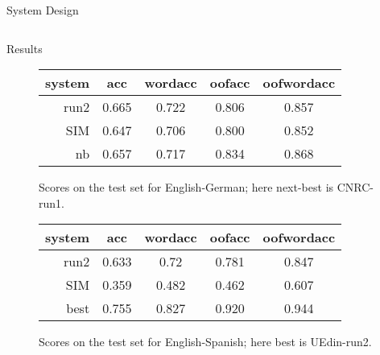 \documentclass[final,t]{beamer}
\begin{document}
\begin{frame}{}
\begin{columns}[t]
\begin{column}{.55\linewidth}
\begin{block}{System Design}
\begin{center}
\end{center}

\end{block}

    \end{column}
  \end{columns}

\begin{columns}
  \begin{column}{.64\linewidth}

\begin{block}{Results}

\begin{figure}[t]
  \begin{center}
  \begin{tabular}{|r|c|c|c|c|}
    \hline
    system & acc      & wordacc  & oofacc & oofwordacc \\
    \hline
    run2  &  0.665 & 0.722  &  0.806  & 0.857 \\
    SIM    &  0.647 & 0.706 & 0.800 & 0.852 \\
    nb     &  0.657   & 0.717   & 0.834 & 0.868    \\
    \hline
  \end{tabular}
  \end{center}
\caption{Scores on the test set for English-German; here next-best is CNRC-run1.}
\label{fig:theresults-en-de}
\end{figure}

\begin{figure}[t]
  \begin{center}
  \begin{tabular}{|r|c|c|c|c|}
    \hline
    system & acc      & wordacc  & oofacc & oofwordacc \\
    \hline
    run2  &  0.633 & 0.72 & 0.781 & 0.847 \\
    SIM    &  0.359 &  0.482 & 0.462 & 0.607 \\
    best   &  0.755 & 0.827   & 0.920  & 0.944 \\
    \hline
  \end{tabular}
  \end{center}
\caption{Scores on the test set for English-Spanish; here best is UEdin-run2.}
\label{fig:theresults-en-es}
\end{figure}


\end{block}
\end{column}
\end{columns}
\end{frame}
\end{document}

